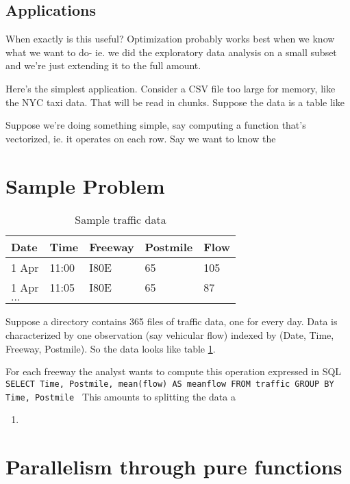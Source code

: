 \documentclass[12pt]{article}
\begin{document}
\subsection{Applications}

When exactly is this useful? Optimization probably works best when we know what we want
to do- ie. we did the exploratory data analysis on a small subset and we're
just extending it to the full amount.

Here's the simplest application.
Consider a CSV file too large for memory, like the NYC taxi data. 
That will
be read in chunks. Suppose the data is a table like 

Suppose we're doing something simple, say computing a
function that's vectorized, ie. it operates on each row. Say we want to
know the 

\section{Sample Problem}

\begin{table}
    \begin{tabular}{| l | l | l | l | l |}
    \hline
        Date & Time & Freeway & Postmile & Flow \\ \hline
        1 Apr & 11:00 & I80E & 65 & 105 \\ 
        1 Apr & 11:05 & I80E & 65 & 87 \\ 
        $\dots$ & & & & \\ \hline
    \end{tabular}
    \caption{Sample traffic data}
    \label{table:traffic}
\end{table}

Suppose a directory contains 365 files of traffic data, one for every day.
Data is characterized by one observation (say vehicular flow)
indexed by (Date, Time, Freeway, Postmile). So the data looks like table
\ref{table:traffic}.

For each freeway the analyst wants to compute this operation expressed in SQL
\texttt{
    SELECT Time, Postmile, mean(flow) AS meanflow FROM traffic GROUP BY Time, Postmile
}
This amounts to splitting the data a

\begin{enumerate}
    \item 
\end{enumerate}

\section{Parallelism through pure functions}
\end{document}
